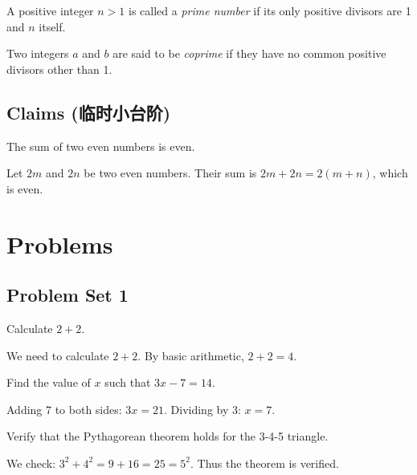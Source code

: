 \documentclass{article}
\begin{document}
\begin{definition}
    A positive integer $n > 1$ is called a \textit{prime number} if its only positive divisors are 1 and $n$ itself.
\end{definition}

\begin{definition*}
    Two integers $a$ and $b$ are said to be \textit{coprime} if they have no common positive divisors other than 1.
\end{definition*}

\subsection{Claims (临时小台阶)}

\begin{claim}
    The sum of two even numbers is even.
\end{claim}

\begin{proofclaim}
    Let $2m$ and $2n$ be two even numbers. Their sum is $2m + 2n = 2(m+n)$, which is even.
\end{proofclaim}

\section{Problems}

\subsection{Problem Set 1}

\begin{problem}
Calculate $2 + 2$.
\end{problem}

\begin{solution}
    We need to calculate $2 + 2$. By basic arithmetic, $2 + 2 = 4$.
\end{solution}

\begin{problem}
Find the value of $x$ such that $3x - 7 = 14$.
\end{problem}

\begin{solution}
    Adding 7 to both sides: $3x = 21$. Dividing by 3: $x = 7$.
\end{solution}

\begin{problem*}
    Verify that the Pythagorean theorem holds for the 3-4-5 triangle.
\end{problem*}

\begin{solution*}
    We check: $3^2 + 4^2 = 9 + 16 = 25 = 5^2$. Thus the theorem is verified.
\end{solution*}
\end{document}
